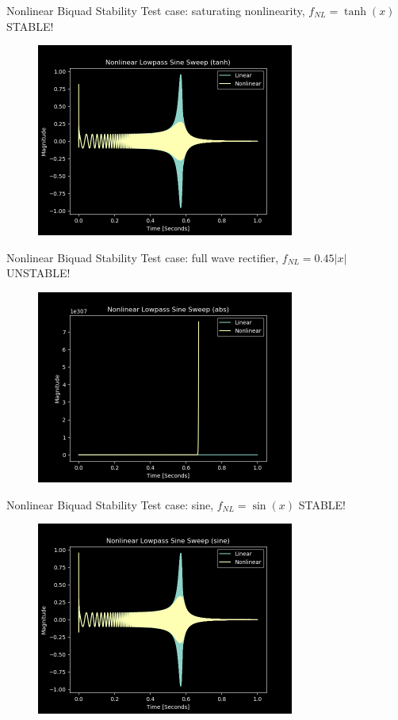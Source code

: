 \begin{frame}{Nonlinear Biquad Stability}
    Test case: saturating nonlinearity, $f_{NL} = \tanh(x)$ \rightarrow STABLE!
    \begin{figure}
        \includegraphics[height=2.5in]{Figures/nl_lpf_stable.png}
    \end{figure}
\end{frame}

\begin{frame}{Nonlinear Biquad Stability}
    Test case: full wave rectifier, $f_{NL} = 0.45 |x|$ \rightarrow UNSTABLE!
    \begin{figure}
        \includegraphics[height=2.5in]{Figures/nl_lpf_unstable.png}
    \end{figure}
\end{frame}

\begin{frame}{Nonlinear Biquad Stability}
    Test case: sine, $f_{NL} = \sin (x)$ \rightarrow STABLE!
    \begin{figure}
        \includegraphics[height=2.5in]{Figures/nl_lpf_sine.png}
    \end{figure}
\end{frame}

